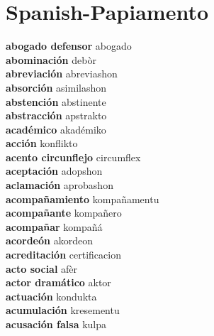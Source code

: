 \twocolumn
\chapter{Spanish-Papiamento}
\small
{}\textbf{ abogado defensor  } abogado \\
\textbf{ abominación  } debòr \\
\textbf{ abreviación  } abreviashon \\
\textbf{ absorción  } asimilashon \\
\textbf{ abstención  } abstinente \\
\textbf{ abstracción  } apstrakto \\
\textbf{ académico  } akadémiko \\
\textbf{ acción  } konflikto \\
\textbf{ acento circunflejo  } circumflex \\
\textbf{ aceptación  } adopshon \\
\textbf{ aclamación  } aprobashon \\
\textbf{ acompañamiento  } kompañamentu \\
\textbf{ acompañante  } kompañero \\
\textbf{ acompañar  } kompañá \\
\textbf{ acordeón  } akordeon \\
\textbf{ acreditación  } certificacion \\
\textbf{ acto social  } afèr \\
\textbf{ actor dramático  } aktor \\
\textbf{ actuación  } kondukta \\
\textbf{ acumulación  } kresementu \\
\textbf{ acusación falsa  } kulpa \\

